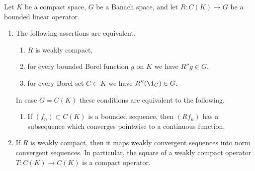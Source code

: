 \begin{proposition}\label{prop:b4-2.4}
	Let $K$ be a compact space, $G$ be a Banach space, and let $R \colon C(K) \to G$ be a bounded linear operator.
	
\begin{enumerate}[\upshape (i)]
    \item
    The following assertions are equivalent.
    \begin{enumerate}[\upshape (a)]
    \item 
    $R$ is weakly compact,

    \item 
    for every bounded Borel function $g$ on $K$ we have $R''g \in G$,

    \item 
    for every Borel set $C \subset K$ we have $R''(\1_C) \in G$.
\end{enumerate}
In case $G = C(K)$ these conditions are equivalent to the following.
	\begin{enumerate}
	\item 
	If\/ $(f_n) \subset C(K)$ is a bounded sequence, then $(Rf_n)$ has a subsequence which converges pointwise to a continuous function.
    \end{enumerate}
	
\item 
If\/ $R$ is weakly compact, then it maps weakly convergent sequences into norm convergent sequences.
In particular, the square of a weakly
compact operator $T \colon C(K) \to C(K)$ is a compact operator.
\end{enumerate}
\end{proposition}
